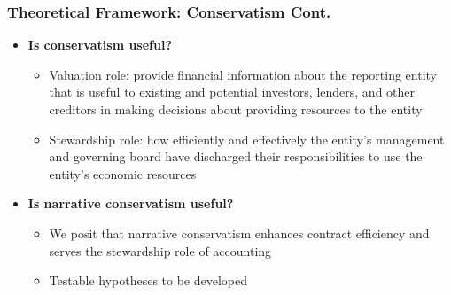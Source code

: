 \documentclass{beamer}
\begin{document}
\begin{frame}
	\frametitle{Theoretical Framework: Conservatism Cont.}
	\begin{itemize}

\item \textbf{Is conservatism useful?}

	\begin{itemize}
		\item Valuation role: provide financial information about the reporting entity that is useful to existing and potential investors, lenders, and other creditors in making decisions about providing resources to the entity \citep[OB2]{fasbConceptualFrameworkFinancial2018b}
		\item Stewardship role: how efficiently and effectively the entity's management and governing board have discharged their responsibilities to use the entity's economic resources \cite[OB4]{fasbConceptualFrameworkFinancial2018b}
	\end{itemize}

\item \textbf{Is narrative conservatism useful?}
	\begin{itemize}
		\item We posit that narrative conservatism enhances contract efficiency and serves the stewardship role of accounting
		\item Testable hypotheses to be developed
	\end{itemize}

\end{itemize}
\end{frame}
\end{document}
